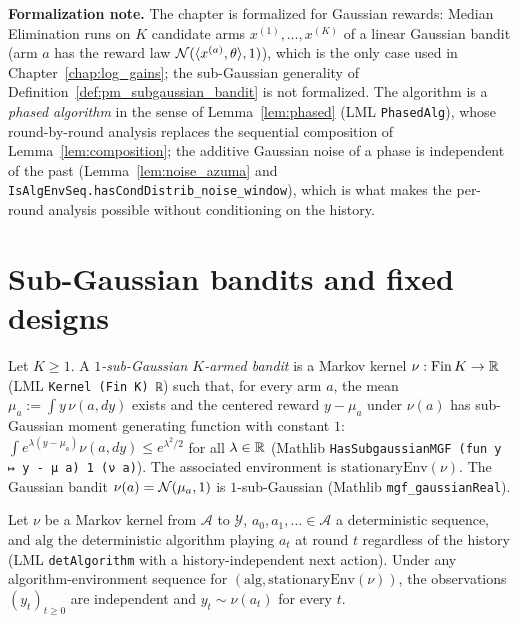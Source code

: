 \textbf{Formalization note.} The chapter is formalized for Gaussian rewards: Median Elimination
runs on $K$ candidate arms $x^{(1)},\dots,x^{(K)}$ of a linear Gaussian bandit (arm $a$ has the
reward law $\mathcal{N}(\langle x^{(a)}, \theta \rangle,1)$), which is the only case used in
Chapter~\ref{chap:log_gains}; the sub-Gaussian generality of
Definition~\ref{def:pm_subgaussian_bandit} is not formalized. The algorithm is a \emph{phased
algorithm} in the sense of Lemma~\ref{lem:phased} (LML \texttt{PhasedAlg}), whose round-by-round
analysis replaces the sequential composition of Lemma~\ref{lem:composition}; the additive
Gaussian noise of a phase is independent of the past (Lemma~\ref{lem:noise_azuma} and
\texttt{IsAlgEnvSeq.hasCondDistrib\_noise\_window}), which is what makes the per-round
analysis possible without conditioning on the history.

\section{Sub-Gaussian bandits and fixed designs}
\label{sec:pre_median_setting}

\begin{definition}\label{def:pm_subgaussian_bandit}
Let $K\ge1$. A \emph{$1$-sub-Gaussian $K$-armed bandit} is a Markov kernel
$\nu : \mathrm{Fin}\,K\to\mathbb{R}$ (LML \texttt{Kernel (Fin K) ℝ}) such that, for every arm $a$, the
mean $\mu_a := \int y\,\nu(a,dy)$ exists and the centered reward $y - \mu_a$ under $\nu(a)$ has
sub-Gaussian moment generating function with constant $1$: $\int e^{\lambda(y-\mu_a)}\nu(a,dy)\le e^{\lambda^2/2}$
for all $\lambda\in\mathbb{R}$ (Mathlib \texttt{HasSubgaussianMGF (fun y ↦ y - μ a) 1 (ν a)}). The
associated environment is $\mathrm{stationaryEnv}(\nu)$. The Gaussian bandit
$\nu(a) = \mathcal{N}(\mu_a,1)$ is $1$-sub-Gaussian (Mathlib \texttt{mgf\_gaussianReal}).
\end{definition}

\begin{lemma}\label{lem:pm_fixed_design_rewards}
\leanok
{}
Let $\nu$ be a Markov kernel from $\mathcal{A}$ to $\mathcal{Y}$, $a_0,a_1,\dots\in\mathcal{A}$ a
deterministic sequence, and $\mathrm{alg}$ the deterministic algorithm playing $a_t$ at round $t$
regardless of the history (LML \texttt{detAlgorithm} with a history-independent next action).
Under any algorithm-environment sequence for $(\mathrm{alg},\mathrm{stationaryEnv}(\nu))$, the
observations $(y_t)_{t\ge0}$ are independent and $y_t\sim\nu(a_t)$ for every $t$.
\end{lemma}

